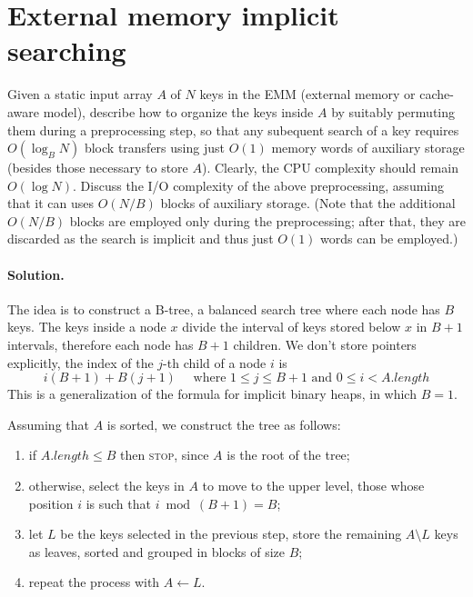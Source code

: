 \section{External memory implicit searching}
Given a static input array $A$ of $N$ keys in the EMM (external memory or cache-aware model), describe how to organize the keys inside $A$ by suitably permuting them during a preprocessing step, so that any subequent search of a key requires $O(\log_B N)$ block transfers using just $O(1)$ memory words of auxiliary storage (besides those necessary to store $A$). Clearly, the CPU complexity should remain $O(\log N)$. Discuss the I/O complexity of the above preprocessing, assuming that it can uses $O(N/B)$ blocks of auxiliary storage. (Note that the additional $O(N/B)$ blocks are employed only during the preprocessing; after that, they are discarded as the search is implicit and thus just $O(1)$ words can be employed.)

\vspace{0.5cm}
\paragraph{Solution.} The idea is to construct a B-tree, a balanced search tree where each node has $B$ keys. The keys inside a node $x$ divide the interval of keys stored below $x$ in $B+1$ intervals, therefore each node has $B+1$ children. We don't store pointers explicitly, the index of the $j$-th child of a node $i$ is
$$i(B+1)+B(j+1) \quad \text{ where } 1 \leq j \leq B+1 \text{ and } 0 \leq i < A.length$$
This is a generalization of the formula for implicit binary heaps, in which $B=1$.

Assuming that $A$ is sorted, we construct the tree as follows:
\begin{enumerate}
  \item if $A.length \leq B$ then \textsc{stop}, since $A$ is the root of the tree;
  \item otherwise, select the keys in $A$ to move to the upper level, those whose position $i$ is such that $i \bmod (B+1) = B$;
  \item let $L$ be the keys selected in the previous step, store the remaining $A \setminus L$ keys as leaves, sorted and grouped in blocks of size $B$;
  \item repeat the process with $A \gets L$.
\end{enumerate}

